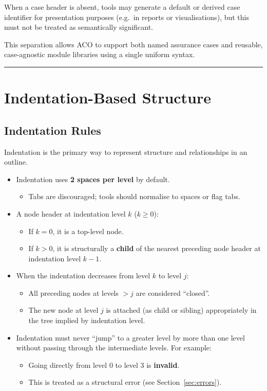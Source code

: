 \documentclass[11pt]{article}
\begin{document}
When a case header is absent, tools may generate a default or derived case identifier
for presentation purposes (e.g.\ in reports or visualisations), but this must not be
treated as semantically significant.

This separation allows ACO to support both named assurance cases and reusable,
case-agnostic module libraries using a single uniform syntax.

\bigskip
\hrule
\bigskip

\section{Indentation-Based Structure}

\subsection{Indentation Rules}

Indentation is the primary way to represent structure and relationships in an outline.

\begin{itemize}[leftmargin=2em]
  \item Indentation uses \textbf{2 spaces per level} by default.
  \begin{itemize}[leftmargin=1.5em]
    \item Tabs are discouraged; tools should normalise to spaces or flag tabs.
  \end{itemize}

  \item A node header at indentation level \(k\) (\(k \geq 0\)):
  \begin{itemize}[leftmargin=1.5em]
    \item If \(k = 0\), it is a top-level node.
    \item If \(k > 0\), it is structurally a \textbf{child} of the nearest preceding node header at indentation level \(k - 1\).
  \end{itemize}

  \item When the indentation decreases from level \(k\) to level \(j\):
  \begin{itemize}[leftmargin=1.5em]
    \item All preceding nodes at levels \(> j\) are considered ``closed''.
    \item The new node at level \(j\) is attached (as child or sibling) appropriately in the tree implied by indentation level.
  \end{itemize}

  \item Indentation must never ``jump'' to a greater level by more than one level without passing through the intermediate levels. For example:
  \begin{itemize}[leftmargin=1.5em]
    \item Going directly from level 0 to level 3 is \textbf{invalid}.
    \item This is treated as a structural error (see Section~\ref{sec:errors}).
  \end{itemize}
\end{itemize}
\end{document}

